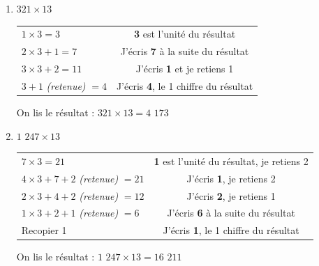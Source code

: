 \documentclass[a4paper]{article}
\begin{document}
\begin{small}
\begin{enumerate}

\item $321 \times 13$ 

	\begin{tabular}{l|c}

		$1 \times 3 = 3$ & \textbf{3} est l'unité du résultat
		
		\tabularnewline
		
		$2 \times 3 + 1 = 7$ & J'écris \textbf{7} à la suite du résultat
		
		\tabularnewline
		
		$3 \times 3 + 2 = 11$ & J'écris \textbf{1} et je retiens 1
		
		\tabularnewline
		
		$3 + 1$ \textit{(retenue)} $= 4$ & J'écris \textbf{4}, le 1\up{er} chiffre du résultat
		
	\end{tabular}
	
	On lis le résultat : {\boldmath $321 \times 13 = 4$ $173$}\\



	\item $1$ $247 \times 13$

	\begin{tabular}{l|c}

		$7 \times 3 = 21$ & \textbf{1} est l'unité du résultat, je retiens 2
		
		\tabularnewline
		
		$4 \times 3 + 7 + 2$ \textit{(retenue)} $= 21$ & J'écris \textbf{1}, je retiens 2
		
		\tabularnewline
		
		$2 \times 3 + 4 + 2$ \textit{(retenue)} $= 12$ & J'écris \textbf{2}, je retiens 1
		
		\tabularnewline
		
		$1 \times 3 + 2 + 1$ \textit{(retenue)} $= 6$ & J'écris \textbf{6} à la suite du résultat
		
		\tabularnewline
		
		Recopier 1 & J'écris \textbf{1}, le 1\up{er} chiffre du résultat

	\end{tabular}
	
	On lis le résultat : {\boldmath $1$ $247 \times 13 = 16$ $211$}\\

\end{enumerate}
\end{small}
\end{document}
